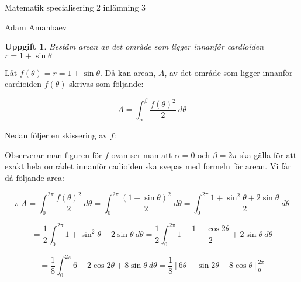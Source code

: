 \documentclass{article}
\newtheorem{thr}{Uppgift}
\begin{document}


\newpage

\centerline{\large Matematik specialisering 2 inlämning 3}

\vskip 0.1cm

\centerline{\scriptsize Adam Amanbaev}

\vskip 1cm

\begin{thr}
Bestäm arean av det område som ligger innanför cardioiden $r=1+\sin\theta$
\end{thr}

Låt $f(\theta)=r=1+\sin\theta$. Då kan arean, $A$, av det område som ligger innanför cardioiden $f(\theta)$ skrivas som följande:

$$
A=
\int_{\alpha}^{\beta} \frac{f(\theta)^2}{2} \: d\theta
$$

\vskip 0.2cm

Nedan följer en skissering av $f$:

\begin{figure}[h]
    \center
\end{figure}

Observerar man figuren för $f$ ovan ser man att $\alpha=0$ och $\beta=2\pi$ ska gälla för att exakt hela området innanför cadioiden ska svepas med formeln för arean. Vi får då följande area:

$$
\therefore 
\;
A=
\int_{0}^{2\pi} \frac{f(\theta)^2}{2} \: d\theta
=
\int_{0}^{2\pi} \frac{(1+\sin\theta)^2}{2} \: d\theta
=
\int_{0}^{2\pi} \frac{1+\sin^2 \theta+2\sin\theta}{2} \: d\theta
$$

$$
=
\frac{1}{2}
\int_{0}^{2\pi} 1+\sin^2 \theta+2\sin\theta \: d\theta
=
\frac{1}{2}
\int_{0}^{2\pi} 1+\frac{1-\cos 2\theta}{2}+2\sin\theta \: d\theta
$$

$$
=
\frac{1}{8}
\int_{0}^{2\pi} 6-2\cos 2\theta+8\sin\theta \: d\theta
=
\frac{1}{8}
\left[6\theta-\sin2\theta-8\cos\theta \right]_{0}^{2\pi}
$$
\end{document}
